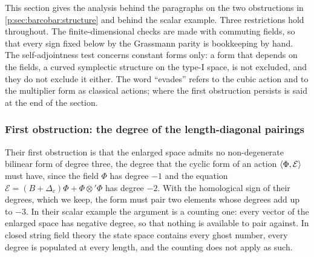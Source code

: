 
This section gives the analysis behind the paragraphs on the two obstructions in \cref{p:sec:barcobar:structure} and behind the scalar example.
Three restrictions hold throughout.
The finite-dimensional checks are made with commuting fields, so that every sign fixed below by the Grassmann parity is bookkeeping by hand.
The self-adjointness test concerns constant forms only: a form that depends on the fields, a curved symplectic structure on the type-I space, is not excluded, and they do not exclude it either.
The word \enquote{evades} refers to the cubic action and to the multiplier form as classical actions; where the first obstruction persists is said at the end of the section.

\subsubsection{First obstruction: the degree of the length-diagonal pairings}
\label{sec:bc:obstructions}

Their first obstruction is that the enlarged space admits no non-degenerate bilinear form of degree three, the degree that the cyclic form of an action $\braket{\Phi, \mathcal E}_{}$ must have, since the field $\Phi$ has degree $-1$ and the equation $\mathcal E = (B + \Delta_c) \Phi + \Phi \otimes' \Phi$ has degree $-2$.
With the homological sign of their degrees, which we keep, the form must pair two elements whose degrees add up to $-3$.
In their scalar example the argument is a counting one: every vector of the enlarged space has negative degree, so that nothing is available to pair against.
In closed string field theory the state space contains every ghost number, every degree is populated at every length, and the counting does not apply as such.

